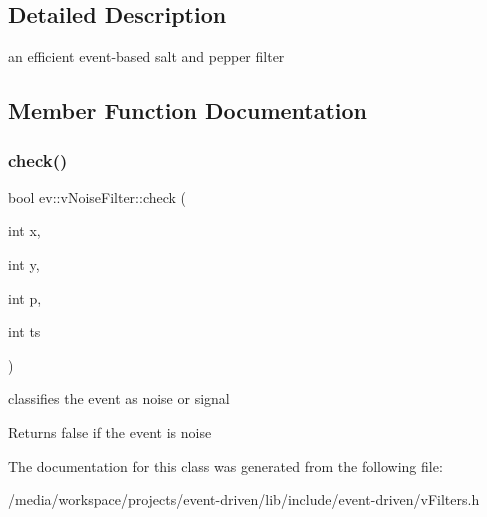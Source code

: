 \subsection{Detailed Description}
an efficient event-\/based salt and pepper filter 

\subsection{Member Function Documentation}
\mbox{\label{classev_1_1vNoiseFilter_a8aa612fbfc163398c600853329768892}} 
\subsubsection{\texorpdfstring{check()}{check()}}
{\footnotesize\ttfamily bool ev\+::v\+Noise\+Filter\+::check (\begin{DoxyParamCaption}\item[{int}]{x,  }\item[{int}]{y,  }\item[{int}]{p,  }\item[{int}]{ts }\end{DoxyParamCaption})\hspace{0.3cm}{\ttfamily [inline]}}



classifies the event as noise or signal 

\begin{DoxyReturn}{Returns}
false if the event is noise 
\end{DoxyReturn}


The documentation for this class was generated from the following file\+:\begin{DoxyCompactItemize}
\item 
/media/workspace/projects/event-\/driven/lib/include/event-\/driven/v\+Filters.\+h\end{DoxyCompactItemize}

